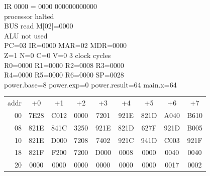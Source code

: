 \noindent\begin{tcolorbox}[stepbox, title={Step 42 \hfill PC 02 \quad HALT}]
\textcolor{dim}{IR} 0000 = 0000 000000000000\\
processor halted\\
\textcolor{dim}{BUS} read M[02]=0000\\
\textcolor{dim}{ALU} \textcolor{dim}{not used}\\
PC=03 IR=0000 MAR=02 MDR=0000\\
Z=1 N=0 C=0 V=0 \hfill \textcolor{dim}{3 clock cycles}\\
R0=0000 R1=0000 R2=0008 R3=0000\\
R4=0000 R5=0000 R6=0000 SP=0028\\
\textcolor{dim}{power.base=8  power.exp=0  power.result=64  main.x=64}\\[1pt]
{\setlength{\tabcolsep}{1.6pt}\begin{tabular}{@{}r*{8}{c}@{}}
\textcolor{dim}{addr} & \textcolor{dim}{+0} & \textcolor{dim}{+1} & \textcolor{dim}{+2} & \textcolor{dim}{+3} & \textcolor{dim}{+4} & \textcolor{dim}{+5} & \textcolor{dim}{+6} & \textcolor{dim}{+7}\\
\textcolor{dim}{00} & 7E28 & C012 & 0000 & 7201 & 921E & 821D & A040 & B610\\
\textcolor{dim}{08} & 821E & 841C & 3250 & 921E & 821D & 627F & 921D & B005\\
\textcolor{dim}{10} & 821E & D000 & 7208 & 7402 & 921C & 941D & C003 & 921F\\
\textcolor{dim}{18} & 821F & F200 & 7200 & D000 & \cellcolor{datac}0008 & \cellcolor{datac}0000 & \cellcolor{datac}0040 & \cellcolor{datac}0040\\
\textcolor{dim}{20} & \cellcolor{stackc}0000 & \cellcolor{stackc}0000 & \cellcolor{stackc}0000 & \cellcolor{stackc}0000 & \cellcolor{stackc}0000 & \cellcolor{stackc}0000 & \cellcolor{stackc}0017 & \cellcolor{stackc}0002\\
\end{tabular}}
\end{tcolorbox}\par\vspace{3pt}
